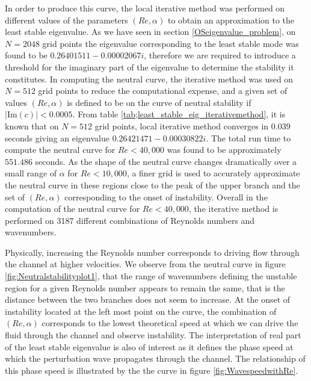 \documentclass[a4paper, 12pt, twoside, openright]{article}
\numberwithin{equation}{section}
\begin{document}
In order to produce this curve, the local iterative method was performed on different values of the parameters $(Re,\alpha)$ to obtain an approximation to the least stable eigenvalue. As we have seen in section \ref{OSeigenvalue_problem}, on $N=2048$ grid points the eigenvalue corresponding to the least stable mode was found to be $0.26401511-0.00002067i$, therefore we are required to introduce a threshold for the imaginary part of the eigenvalue to determine the stability it constitutes. In computing the neutral curve, the iterative method was used on $N=512$ grid points to reduce the computational expense, and a given set of values $(Re,\alpha)$ is defined to be on the curve of neutral stability if $|\mathrm{Im}(c)|<0.0005$. From table \ref{tab;least_stable_eig_iterativemethod}, it is known that on $N=512$ grid points, local iterative method converges in $0.039$ seconds giving an eigenvalue $ 0.26421471 - 0.00030822i $. The total run time to compute the neutral curve for $Re<40,000$ was found to be approximately $551.486$ seconds. As the shape of the neutral curve changes dramatically over a small range of $\alpha$ for $Re<10,000$, a finer grid is used to accurately approximate the neutral curve in these regions close to the peak of the upper branch and the set of $(Re,\alpha)$ corresponding to the onset of instability. Overall in the computation of the neutral curve for $Re<40,000$, the iterative method is performed on 3187 different combinations of Reynolds numbers and wavenumbers. %
      
%
%
% 


Physically, increasing the Reynolds number corresponds to driving flow through the channel at higher velocities. We observe from the neutral curve in figure \ref{fig:Neutralstabilityplot1}, that the range of wavenumbers defining the unstable region for a given Reynolds number appears to remain the same, that is the distance between the two branches does not seem to increase. At the onset of instability located at the left most point on the curve, the combination of $(Re,\alpha)$ corresponds to the lowest theoretical speed at which we can drive the fluid through the channel and observe instability. The interpretation of real part of the least stable eigenvalue is also of interest as it defines the phase speed at which the perturbation wave propagates through the channel. The relationship of this phase speed is illustrated by the the curve in figure \ref{fig:WavespeedwithRe}. %
 
\end{document}
